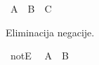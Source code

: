 \begin{isabellebody}
\begin{exercise}[subtitle=Intuicionistička pravila prirodne dedukcije iskazne logike.]
\ {\isachardoublequoteopen}A\ {\isasymlongleftrightarrow}\ B\ {\isasymLongrightarrow}\ C{\isachardoublequoteclose}\isanewline
\ \ %
\isadelimproof
%
\endisadelimproof
%
\isatagproof
%
\endisatagproof
{\isafoldproof}%
%
\isadelimproof
%
\endisadelimproof
%
\begin{isamarkuptext}%
Eliminacija negacije. %
\end{isamarkuptext}\isamarkuptrue%
\isamarkupfalse%
\ notE\isanewline
\isanewline
{}\isamarkupfalse%
\ {\isachardoublequoteopen}{\isasymnot}\ A\ {\isasymLongrightarrow}\ B{\isachardoublequoteclose}\ \isanewline
\ \ %
\isadelimproof
%
\endisadelimproof
%
\isatagproof
%
\endisatagproof
{\isafoldproof}%
%
\isadelimproof
%
\endisadelimproof
%
\end{exercise}
%
\isadelimtheory
%
\endisadelimtheory
%
\isatagtheory
%
\endisatagtheory
{\isafoldtheory}%
%
\isadelimtheory
%
\endisadelimtheory
%
\end{isabellebody}%
\endinput
